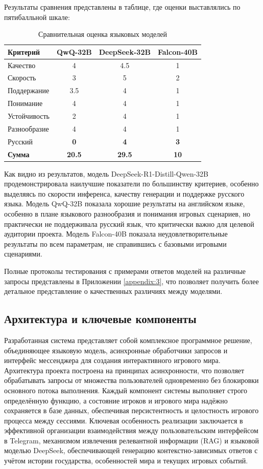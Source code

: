 Результаты сравнения представлены в таблице, где оценки выставлялись по пятибалльной шкале:

\begin{table}[h]
\centering
\caption{Сравнительная оценка языковых моделей}
\label{tab:compare_models}
\begin{tabular}{|l|c|c|c|}
\hline
\textbf{Критерий} & \textbf{QwQ-32B} & \textbf{DeepSeek-32B} & \textbf{Falcon-40B} \\
\hline
Качество & 4 & 4.5 & 1 \\
\hline
Скорость & 3 & 5 & 2 \\
\hline
Поддержание & 3.5 & 4 & 1 \\
\hline
Понимание & 4 & 4 & 1 \\
\hline
Устойчивость & 2 & 4 & 1 \\
\hline
Разнообразие & 4 & 4 & 1 \\
\hline
Русский & \textbf{0} & \textbf{4} & \textbf{3} \\
\hline
\textbf{Сумма} & \textbf{20.5} & \textbf{29.5} & \textbf{10} \\
\hline
\end{tabular}
\end{table}


Как видно из результатов, модель DeepSeek-R1-Distill-Qwen-32B продемонстрировала наилучшие показатели по большинству критериев, особенно выделяясь по скорости инференса, качеству генерации и поддержке русского языка. Модель QwQ-32B показала хорошие результаты на английском языке, особенно в плане языкового разнообразия и понимания игровых сценариев, но практически не поддерживала русский язык, что критически важно для целевой аудитории проекта. Модель Falcon-40B показала неудовлетворительные результаты по всем параметрам, не справившись с базовыми игровыми сценариями.

Полные протоколы тестирования с примерами ответов моделей на различные запросы представлены в Приложении \ref{appendix:3}, что позволяет получить более детальное представление о качественных различиях между моделями.

\subsection{Архитектура и ключевые компоненты}
Разработанная система представляет собой комплексное программное решение, объединяющее языковую модель, асинхронные обработчики запросов и интерфейс мессенджера для создания интерактивного игрового мира. Архитектура проекта построена на принципах асинхронности, что позволяет обрабатывать запросы от множества пользователей одновременно без блокировки основного потока выполнения. Каждый компонент системы выполняет строго определённую функцию, а состояние игроков и игрового мира надёжно сохраняется в базе данных, обеспечивая персистентность и целостность игрового процесса между сессиями. Ключевая особенность реализации заключается в эффективной организации взаимодействия между пользовательским интерфейсом в Telegram, механизмом извлечения релевантной информации (RAG) и языковой моделью DeepSeek, обеспечивающей генерацию контекстно-зависимых ответов с учётом истории государства, особенностей мира и текущих игровых событий.
